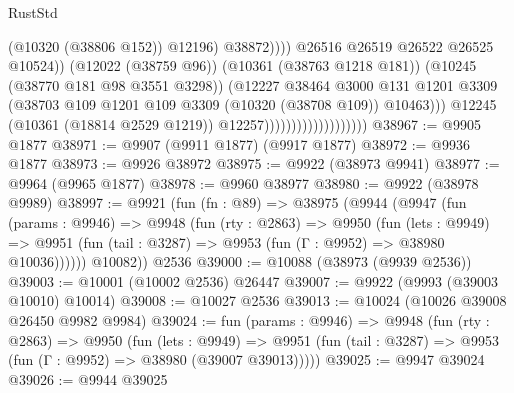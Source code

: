 \begin{lexlean}{RustStd}
\begin{coremodule}
                                                          (@10320 (@38806 @152))
                                                          @12196)
                                                        @38872))))
                                                @26516
                                                @26519
                                                @26522
                                                @26525
                                                @10524))
                                            (@12022 (@38759 @96))
                                            (@10361 (@38763 @1218 @181))
                                            (@10245 (@38770 @181 @98 @3551 @3298))
                                            (@12227
                                              @38464
                                              @3000
                                              @131
                                              @1201
                                              @3309
                                              (@38703
                                                @109
                                                @1201
                                                @109
                                                @3309
                                                (@10320 (@38708 @109))
                                                @10463)))
                                          @12245
                                          (@10361 (@18814 @2529 @1219))
                                          @12257)))))))))))))))))))
@38967 := @9905 @1877
@38971 := @9907 (@9911 @1877) (@9917 @1877)
@38972 := @9936 @1877
@38973 := @9926 @38972
@38975 := @9922 (@38973 @9941)
@38977 := @9964 (@9965 @1877)
@38978 := @9960 @38977
@38980 := @9922 (@38978 @9989)
@38997 := @9921
    (fun (fn : @89) =>
    @38975
      (@9944
        (@9947
          (fun (params : @9946) =>
          @9948
            (fun (rty : @2863) =>
            @9950
              (fun (lets : @9949) =>
              @9951 (fun (tail : @3287) => @9953 (fun (Γ : @9952) => @38980 @10036))))))
        @10082))
    @2536
@39000 := @10088 (@38973 (@9939 @2536))
@39003 := @10001 (@10002 @2536) @26447
@39007 := @9922 (@9993 (@39003 @10010) @10014)
@39008 := @10027 @2536
@39013 := @10024 (@10026 @39008 @26450 @9982 @9984)
@39024 := fun (params : @9946) =>
  @9948
    (fun (rty : @2863) =>
    @9950
      (fun (lets : @9949) =>
      @9951 (fun (tail : @3287) => @9953 (fun (Γ : @9952) => @38980 (@39007 @39013)))))
@39025 := @9947 @39024
@39026 := @9944 @39025

\end{coremodule}
\end{lexlean}
